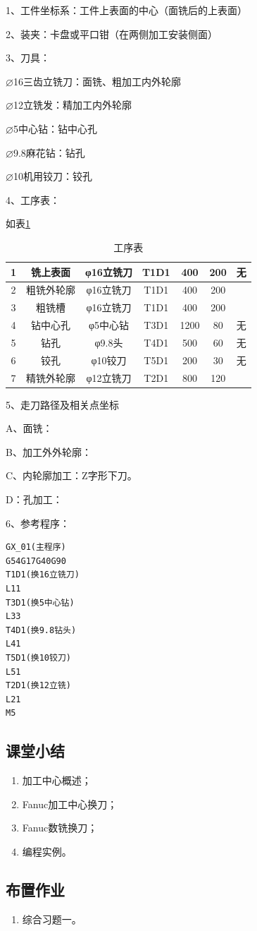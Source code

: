 1、工件坐标系：工件上表面的中心（面铣后的上表面）

2、装夹：卡盘或平口钳（在两侧加工安装侧面）

3、刀具：

$\varnothing$16三齿立铣刀：面铣、粗加工内外轮廓

$\varnothing$12立铣发：精加工内外轮廓

$\varnothing$5中心钻：钻中心孔

$\varnothing$9.8麻花钻：钻孔

$\varnothing$10机用铰刀：铰孔

4、工序表：

如表\ref{biao:1}

\begin{table}[h]
	\centering
	\caption[表]{工序表}
	\label{biao:1}
	\begin{tabular}{|c|c|c|c|c|c|c|}
		\hline 
		1&铣上表面&φ16立铣刀&T1D1&400&200&无\\ 
		\hline 
		2&粗铣外轮廓&φ16立铣刀&T1D1&400&200&\\ 
		\hline
		3&粗铣槽&φ16立铣刀&T1D1&400&200&\\ 
		\hline
		4&钻中心孔&φ5中心钻&T3D1&1200&80&无\\ 
		\hline
		5&钻孔&φ9.8头&T4D1&500&60&无\\ 
		\hline
		6&铰孔&φ10铰刀&T5D1&200&30&无\\ 
		\hline
		7&精铣外轮廓&φ12立铣刀&T2D1&800&120&\\ 
		\hline 
	\end{tabular} 
\end{table}

5、走刀路径及相关点坐标

A、面铣： 

B、加工外外轮廓： 

C、内轮廓加工：Z字形下刀。

D：孔加工：

6、参考程序：

\begin{lstlisting}
GX_01(主程序)
G54G17G40G90
T1D1(换16立铣刀)
L11
T3D1(换5中心钻)
L33
T4D1(换9.8钻头)
L41
T5D1(换10铰刀)
L51
T2D1(换12立铣)
L21
M5
\end{lstlisting}



\subsection{课堂小结}
\begin{enumerate}[1、]
\item 加工中心概述；
\item Fanuc加工中心换刀；
\item Fanuc数铣换刀；
\item 编程实例。
\end{enumerate}

\vfill
\subsection{布置作业}
\begin{enumerate}[1、]
	\item 综合习题一。
\end{enumerate}
\vfill